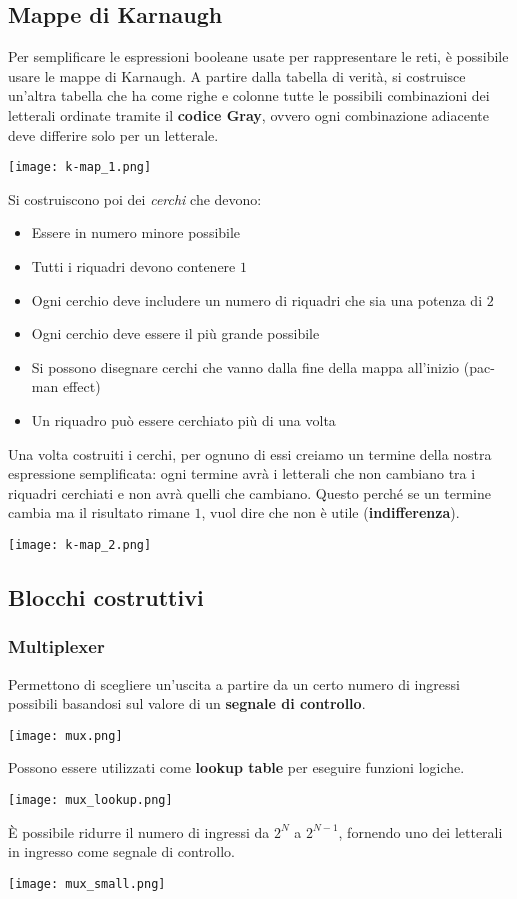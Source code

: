 \subsection{Mappe di Karnaugh}
Per semplificare le espressioni booleane usate per rappresentare le reti, è possibile usare le mappe di Karnaugh. A partire dalla tabella di verità, si costruisce un'altra tabella che ha come righe e colonne tutte le possibili combinazioni dei letterali ordinate tramite il \textbf{codice Gray}, ovvero ogni combinazione adiacente deve differire solo per un letterale.
\begin{center}
	\texttt{[image: k-map\_1.png]}
\end{center}
\newpage
Si costruiscono poi dei \textit{cerchi} che devono:
\begin{itemize}
	\item Essere in numero minore possibile
	\item Tutti i riquadri devono contenere $1$
	\item Ogni cerchio deve includere un numero di riquadri che sia una potenza di $2$
	\item Ogni cerchio deve essere il più grande possibile
	\item Si possono disegnare cerchi che vanno dalla fine della mappa all'inizio (pac-man effect)
	\item Un riquadro può essere cerchiato più di una volta
\end{itemize}
Una volta costruiti i cerchi, per ognuno di essi creiamo un termine della nostra espressione semplificata: ogni termine avrà i letterali che non cambiano tra i riquadri cerchiati e non avrà quelli che cambiano. Questo perché se un termine cambia ma il risultato rimane $1$, vuol dire che non è utile (\textbf{indifferenza}).
\begin{center}
	\texttt{[image: k-map\_2.png]}
\end{center}

\subsection{Blocchi costruttivi}
\subsubsection{Multiplexer}
Permettono di scegliere un'uscita a partire da un certo numero di ingressi possibili basandosi sul valore di un \textbf{segnale di controllo}.
\begin{center}
	\texttt{[image: mux.png]}
\end{center}
Possono essere utilizzati come \textbf{lookup table} per eseguire funzioni logiche.
\begin{center}
	\texttt{[image: mux\_lookup.png]}
\end{center}
È possibile ridurre il numero di ingressi da $2^N$ a $2^{N-1}$, fornendo uno dei letterali in ingresso come segnale di controllo.
\begin{center}
	\texttt{[image: mux\_small.png]}
\end{center}
